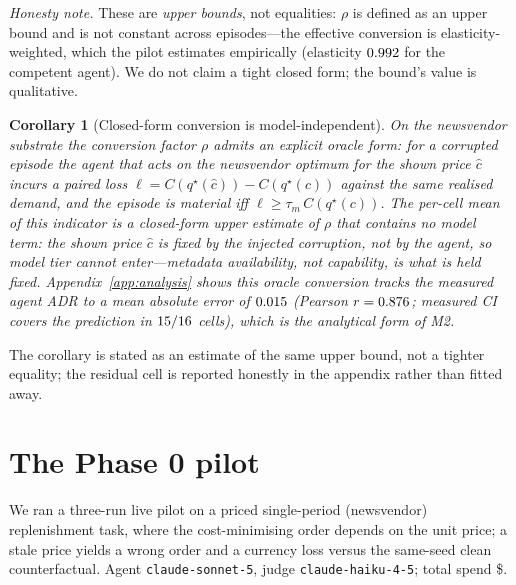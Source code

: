 \documentclass[11pt]{article}
\theoremstyle{plain}
\newtheorem{corollary}{Corollary}
\theoremstyle{definition}
\begin{document}
\noindent\emph{Honesty note.} These are \emph{upper bounds}, not equalities: $\rho$
is defined as an upper bound and is not constant across episodes---the effective
conversion is elasticity-weighted, which
the pilot estimates empirically (elasticity $0.992$ for the competent
agent). We do not claim a tight closed form; the bound's value is qualitative.

\begin{corollary}[Closed-form conversion is model-independent]\label{cor:conv}
On the newsvendor substrate the conversion factor $\rho$ admits an explicit oracle form: for
a corrupted episode the agent that acts on the newsvendor optimum for the \emph{shown} price
$\hat c$ incurs a paired loss $\ell = C(q^\star(\hat c)) - C(q^\star(c))$ against the same
realised demand, and the episode is material iff $\ell \ge \tau_m\,C(q^\star(c))$. The
per-cell mean of this indicator is a closed-form upper estimate of $\rho$ that \emph{contains
no model term}: the shown price $\hat c$ is fixed by the injected corruption, not by the
agent, so model tier cannot enter---metadata availability, not capability, is what is held
fixed. Appendix~\ref{app:analysis} shows this oracle conversion tracks the measured agent ADR
to a mean absolute error of $0.015$ (Pearson $r=0.876$; measured CI covers the prediction
in $15/16$ cells), which is the analytical form of M2.
\end{corollary}
\noindent The corollary is stated as an estimate of the same upper bound, not a tighter
equality; the residual cell is reported honestly in the appendix rather than fitted away.

\section{The Phase 0 pilot}\label{sec:pilot}
We ran a three-run live pilot on a priced single-period (newsvendor) replenishment
task, where the cost-minimising order depends on the unit price; a stale price
yields a wrong order and a currency loss versus the same-seed clean counterfactual.
Agent \texttt{claude-sonnet-5}, judge \texttt{claude-haiku-4-5}; total spend
\$\PhaseZeroSpend.
\end{document}
